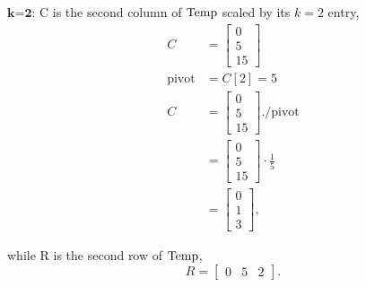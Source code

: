 $\textbf{k=2:}$ C is the second column of ${\rm Temp}$ scaled by its $ k=2$ entry,
\begin{align*}
    C &= \left[ \begin{array}{r} 0 \\ 5 \\15 \end{array} \right] \\
    \textrm{pivot} &= C[2] = 5 \\
    C &= \left[ \begin{array}{r} 0\\ 5 \\ 15 \end{array} \right] .\slash \textrm{pivot} \\
    &= \left[ \begin{array}{r} 0 \\ 5 \\ 15 \end{array} \right] \cdot \frac{1}{5} \\
    &= \left[ \begin{array}{r} 0 \\ 1 \\ 3 \end{array} \right],
\end{align*}

while R is the second row of ${\rm Temp}$,
$$ R = \left[ \begin{array}{rrr} 0 & 5 & 2 \end{array} \right]. $$

